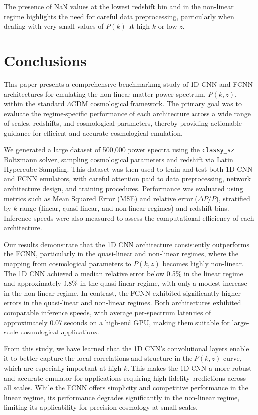 \documentclass[twocolumn]{aastex631}
\begin{document}
The presence of NaN values at the lowest redshift bin and in the non-linear regime highlights the need for careful data preprocessing, particularly when dealing with very small values of $P(k)$ at high $k$ or low $z$.

\section{Conclusions}
\label{sec:conclusions}


This paper presents a comprehensive benchmarking study of 1D CNN and FCNN architectures for emulating the non-linear matter power spectrum, $P(k, z)$, within the standard \(\Lambda\)CDM cosmological framework. The primary goal was to evaluate the regime-specific performance of each architecture across a wide range of scales, redshifts, and cosmological parameters, thereby providing actionable guidance for efficient and accurate cosmological emulation.

We generated a large dataset of 500,000 power spectra using the \texttt{classy\_sz} Boltzmann solver, sampling cosmological parameters and redshift via Latin Hypercube Sampling. This dataset was then used to train and test both 1D CNN and FCNN emulators, with careful attention paid to data preprocessing, network architecture design, and training procedures. Performance was evaluated using metrics such as Mean Squared Error (MSE) and relative error ($\Delta P / P$), stratified by $k$-range (linear, quasi-linear, and non-linear regimes) and redshift bins. Inference speeds were also measured to assess the computational efficiency of each architecture.

Our results demonstrate that the 1D CNN architecture consistently outperforms the FCNN, particularly in the quasi-linear and non-linear regimes, where the mapping from cosmological parameters to $P(k, z)$ becomes highly non-linear. The 1D CNN achieved a median relative error below 0.5\% in the linear regime and approximately 0.8\% in the quasi-linear regime, with only a modest increase in the non-linear regime. In contrast, the FCNN exhibited significantly higher errors in the quasi-linear and non-linear regimes. Both architectures exhibited comparable inference speeds, with average per-spectrum latencies of approximately 0.07 seconds on a high-end GPU, making them suitable for large-scale cosmological applications.

From this study, we have learned that the 1D CNN's convolutional layers enable it to better capture the local correlations and structure in the $P(k, z)$ curve, which are especially important at high $k$. This makes the 1D CNN a more robust and accurate emulator for applications requiring high-fidelity predictions across all scales. While the FCNN offers simplicity and competitive performance in the linear regime, its performance degrades significantly in the non-linear regime, limiting its applicability for precision cosmology at small scales.
\end{document}
